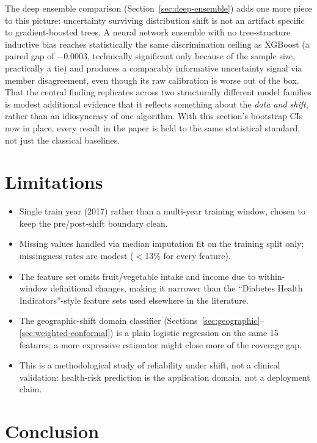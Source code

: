 \documentclass[11pt]{article}
\begin{document}
The deep ensemble comparison (Section~\ref{sec:deep-ensemble}) adds one more piece to this picture: uncertainty surviving distribution shift is not an artifact specific to gradient-boosted trees. A neural network ensemble with no tree-structure inductive bias reaches statistically the same discrimination ceiling as XGBoost (a paired gap of $-0.0003$, technically significant only because of the sample size, practically a tie) and produces a comparably informative uncertainty signal via member disagreement, even though its raw calibration is worse out of the box. That the central finding replicates across two structurally different model families is modest additional evidence that it reflects something about the \emph{data and shift}, rather than an idiosyncrasy of one algorithm. With this section's bootstrap CIs now in place, every result in the paper is held to the same statistical standard, not just the classical baselines.

\section{Limitations}

\begin{itemize}[leftmargin=*]
\item Single train year (2017) rather than a multi-year training window, chosen to keep the pre/post-shift boundary clean.
\item Missing values handled via median imputation fit on the training split only; missingness rates are modest ($<$13\% for every feature).
\item The feature set omits fruit/vegetable intake and income due to within-window definitional changes, making it narrower than the ``Diabetes Health Indicators''-style feature sets used elsewhere in the literature.
\item The geographic-shift domain classifier (Sections~\ref{sec:geographic}--\ref{sec:weighted-conformal}) is a plain logistic regression on the same 15 features; a more expressive estimator might close more of the coverage gap.
\item This is a methodological study of reliability under shift, not a clinical validation: health-risk prediction is the application domain, not a deployment claim.
\end{itemize}

\section{Conclusion}
\end{document}

